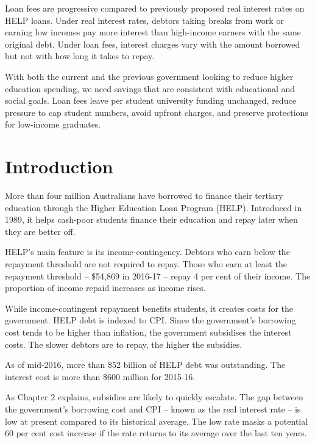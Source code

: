 \documentclass[embargoed]{grattan}
\begin{document}
\begin{overview}
Loan fees are progressive compared to previously proposed real interest rates on HELP loans.
Under real interest rates, debtors taking breaks from work or earning low incomes pay more interest than high-income earners with the same original debt.
Under loan fees, interest charges vary with the amount borrowed but not with how long it takes to repay.

With both the current and the previous government looking to reduce higher education spending, we need savings that are consistent with educational and social goals.
Loan fees leave per student university funding unchanged, reduce pressure to cap student numbers, avoid upfront charges, and preserve protections for low-income graduates.
\end{overview}

\contentspage



\chapter{{Introduction}}\label{introduction}

More than four million Australians have borrowed to finance their tertiary education through the Higher Education Loan Program (HELP).
Introduced in 1989, it helps cash-poor students finance their education and repay later when they are better off.

HELP's main feature is its income-contingency.
Debtors who earn below the repayment threshold are not required to repay.
Those who earn at least the repayment threshold -- \$54,869 in 2016-17 -- repay 4 per cent of their income.
The proportion of income repaid increases as income rises.

While income-contingent repayment benefits students, it creates costs for the government.
HELP debt is indexed to \gls{CPI}.
Since the government's borrowing cost tends to be higher than inflation, the government subsidises the interest costs.
The slower debtors are to repay, the higher the subsidies.

As of mid-2016, more than \$52 billion of HELP debt was outstanding.
The interest cost is more than \$600 million for 2015-16.

As Chapter 2 explains, subsidies are likely to quickly escalate.
The gap between the government's borrowing cost and \gls{CPI} -- known as the real interest rate -- is low at present compared to its historical average.
The low rate masks a potential 60 per cent cost increase if the rate returns to its average over the last ten years.
\end{document}
